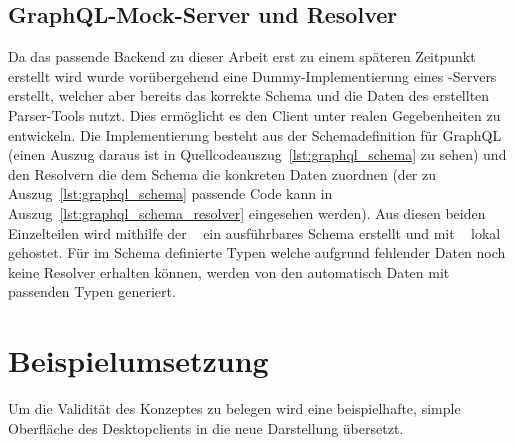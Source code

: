 \subsection{GraphQL-Mock-Server und Resolver}
Da das passende Backend zu dieser Arbeit erst zu einem späteren Zeitpunkt erstellt wird wurde vorübergehend eine Dummy-Implementierung eines -Servers erstellt, welcher aber bereits das korrekte Schema und die Daten des erstellten Parser-Tools nutzt. Dies ermöglicht es den Client unter realen Gegebenheiten zu entwickeln. Die Implementierung besteht aus der Schemadefinition für GraphQL (einen Auszug daraus ist in Quellcodeauszug~\ref{lst:graphql_schema} zu sehen) und den Resolvern die dem Schema die konkreten Daten zuordnen (der zu Auszug~\ref{lst:graphql_schema} passende Code kann in Auszug~\ref{lst:graphql_schema_resolver} eingesehen werden). Aus diesen beiden Einzelteilen wird mithilfe der ~\parencite{apollo_graphql-tools_2019} ein ausführbares Schema erstellt und mit ~\parencite{express_graphql_2018} lokal gehostet. Für im Schema definierte Typen welche aufgrund fehlender Daten noch keine Resolver erhalten können, werden von den  automatisch Daten mit passenden Typen generiert.





\section{Beispielumsetzung}
Um die Validität des Konzeptes zu belegen wird eine beispielhafte, simple Oberfläche des  Desktopclients in die neue Darstellung übersetzt.\\
